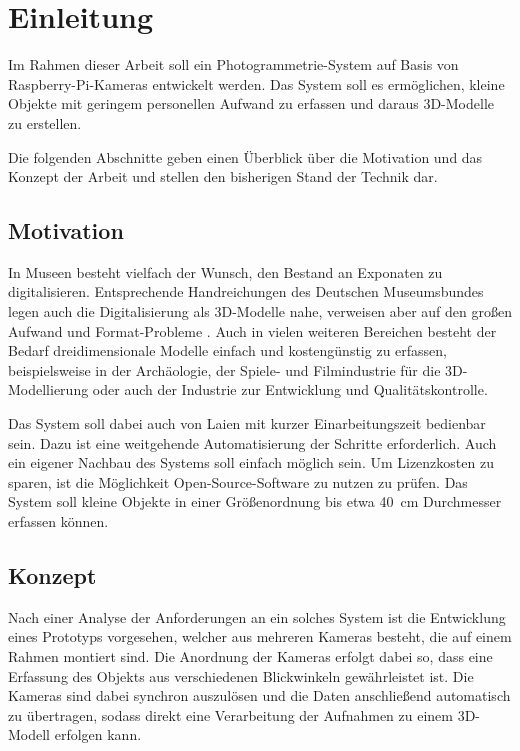 \documentclass[./00PhotoBox]{subfiles}
\begin{document}
\chapter{Einleitung}

Im Rahmen dieser Arbeit soll ein Photogrammetrie-System auf Basis von Raspberry-Pi-Kameras entwickelt werden. Das System soll es ermöglichen, kleine Objekte mit geringem personellen Aufwand zu erfassen und daraus 3D-Modelle zu erstellen.

Die folgenden Abschnitte geben einen Überblick über die Motivation und das Konzept der Arbeit und stellen den bisherigen Stand der Technik dar.

\section{Motivation}

In Museen besteht vielfach der Wunsch, den Bestand an Exponaten zu digitalisieren. Entsprechende Handreichungen des Deutschen Museumsbundes legen auch die Digitalisierung als 3D-Modelle nahe, verweisen aber auf den großen Aufwand und Format-Probleme \citep[S. 43]{handreichung_digital}.
Auch in vielen weiteren Bereichen besteht der Bedarf dreidimensionale Modelle einfach und kostengünstig zu erfassen, beispielsweise in der Archäologie, der Spiele- und Filmindustrie für die 3D-Modellierung oder auch der Industrie zur Entwicklung und Qualitätskontrolle. 

Das System soll dabei auch von Laien mit kurzer Einarbeitungszeit bedienbar sein. Dazu ist eine weitgehende Automatisierung der Schritte erforderlich. Auch ein eigener Nachbau des Systems soll einfach möglich sein. Um Lizenzkosten zu sparen, ist die Möglich\-keit Open-Source-Software zu nutzen zu prüfen. Das System soll kleine Objekte in einer Größenordnung bis etwa 40~cm Durchmesser erfassen können.

\section{Konzept}
Nach einer Analyse der Anforderungen an ein solches System ist die Entwicklung eines Prototyps vorgesehen, welcher aus mehreren Kameras besteht, die auf einem Rahmen montiert sind. Die Anordnung der Kameras erfolgt dabei so, dass eine Erfassung des Objekts aus verschiedenen Blickwinkeln gewährleistet ist. Die Kameras sind dabei synchron auszulösen und die Daten anschließend automatisch zu übertragen, sodass direkt eine Verarbeitung der Aufnahmen zu einem 3D-Modell erfolgen kann.
\end{document}
